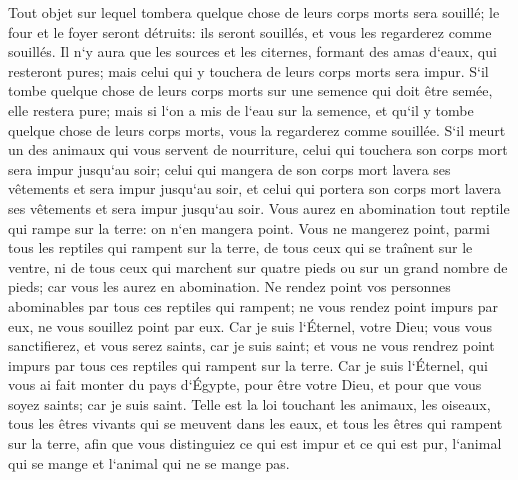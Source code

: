 \verse Tout objet sur lequel tombera quelque chose de leurs corps morts sera souillé; le four et le foyer seront détruits: ils seront souillés, et vous les regarderez comme souillés. 
\verse Il n`y aura que les sources et les citernes, formant des amas d`eaux, qui resteront pures; mais celui qui y touchera de leurs corps morts sera impur. 
\verse S`il tombe quelque chose de leurs corps morts sur une semence qui doit être semée, elle restera pure; 
\verse mais si l`on a mis de l`eau sur la semence, et qu`il y tombe quelque chose de leurs corps morts, vous la regarderez comme souillée. 
\verse S`il meurt un des animaux qui vous servent de nourriture, celui qui touchera son corps mort sera impur jusqu`au soir; 
\verse celui qui mangera de son corps mort lavera ses vêtements et sera impur jusqu`au soir, et celui qui portera son corps mort lavera ses vêtements et sera impur jusqu`au soir. 
\verse Vous aurez en abomination tout reptile qui rampe sur la terre: on n`en mangera point. 
\verse Vous ne mangerez point, parmi tous les reptiles qui rampent sur la terre, de tous ceux qui se traînent sur le ventre, ni de tous ceux qui marchent sur quatre pieds ou sur un grand nombre de pieds; car vous les aurez en abomination. 
\verse Ne rendez point vos personnes abominables par tous ces reptiles qui rampent; ne vous rendez point impurs par eux, ne vous souillez point par eux. 
\verse Car je suis l`Éternel, votre Dieu; vous vous sanctifierez, et vous serez saints, car je suis saint; et vous ne vous rendrez point impurs par tous ces reptiles qui rampent sur la terre. 
\verse Car je suis l`Éternel, qui vous ai fait monter du pays d`Égypte, pour être votre Dieu, et pour que vous soyez saints; car je suis saint. 
\verse Telle est la loi touchant les animaux, les oiseaux, tous les êtres vivants qui se meuvent dans les eaux, et tous les êtres qui rampent sur la terre, 
\verse afin que vous distinguiez ce qui est impur et ce qui est pur, l`animal qui se mange et l`animal qui ne se mange pas. 

